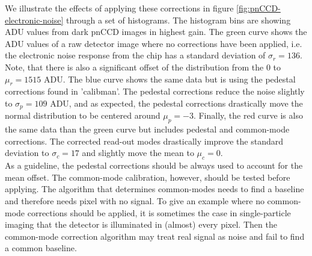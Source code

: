 We illustrate the effects of applying these corrections in figure \ref{fig:pnCCD-electronic-noise} through a set of histograms. The histogram bins are showing ADU values from dark pnCCD images in highest gain. The green curve shows the ADU values of a raw detector image where no corrections have been applied, i.e. the electronic noise response from the chip has a standard deviation of $\sigma_{r}=136$. Note, that there is also a significant offset of the distribution from the 0 to $\mu_{r}=1515$ ADU. The blue curve shows the same data but is using the pedestal corrections found in 'calibman'. The pedestal corrections reduce the noise slightly to $\sigma_{p}=109$ ADU, and as expected, the pedestal corrections drastically move the normal distribution to be centered around $\mu_{p}=-3$. Finally, the red curve is also the same data than the green curve but includes pedestal and common-mode corrections. The corrected read-out modes drastically improve the standard deviation to $\sigma_{c}=17$ and slightly move the mean to $\mu_{c}=0$.\\
As a guideline, the pedestal corrections should be always used to account for the mean offset. The common-mode calibration, however, should be tested before applying. The algorithm that determines common-modes needs to find a baseline and therefore needs pixel with no signal. To give an example where no common-mode corrections should be applied, it is sometimes the case in single-particle imaging that the detector is illuminated in (almost) every pixel. Then the common-mode correction algorithm may treat real signal as noise and fail to find a common baseline.\\
%
%
%
%
%
%
